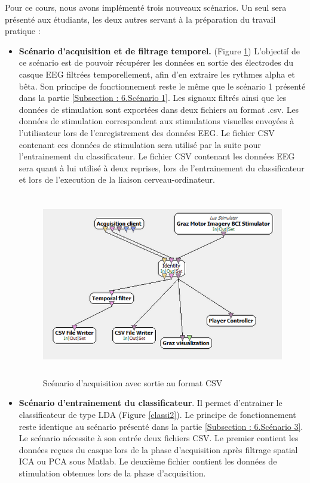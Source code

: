Pour ce cours, nous avons implémenté trois nouveaux scénarios. Un seul sera présenté aux étudiants, les deux autres servant à la préparation du travail pratique :
\smallbreak
\begin{itemize}
	\item \textbf{Scénario d'acquisition et de filtrage temporel.} (Figure \ref{acqui2}) 
	L'objectif de ce scénario est de pouvoir récupérer les données en sortie des électrodes du casque EEG filtrées temporellement, afin d'en extraire les rythmes alpha et bêta. Son principe de fonctionnement reste le même que le scénario 1 présenté dans la partie \ref{Subsection : 6.Scénario 1}. Les signaux filtrés ainsi que les données de stimulation sont exportées dans deux fichiers au format .csv. Les données de stimulation correspondent aux stimulations visuelles envoyées à l'utilisateur lors de l'enregistrement des données EEG. Le fichier CSV contenant ces données de stimulation sera utilisé par la suite pour l'entrainement du classificateur. Le fichier CSV contenant les données EEG sera quant à lui utilisé à deux reprises, lors de l'entrainement du classificateur et lors de l'execution de la liaison cerveau-ordinateur. 
		\begin{figure}[h]
			\centering\includegraphics[height=8cm]{images/scenario_2_0.png}
			\caption{Scénario d'acquisition avec sortie au format CSV}
			\label{acqui2}
		\end{figure}
	\smallbreak
	\item \textbf{Scénario d'entrainement du classificateur}. Il permet d'entrainer le classificateur de type LDA (Figure \ref{classi2}).  Le principe de fonctionnement reste identique au scénario présenté dans la partie \ref{Subsection : 6.Scénario 3}. Le scénario nécessite à son entrée deux fichiers CSV. Le premier contient les données reçues du casque lors de la phase d'acquisition après filtrage spatial ICA ou PCA sous Matlab. Le deuxième fichier contient les données de stimulation obtenues lors de la phase d'acquisition.

\end{itemize}
